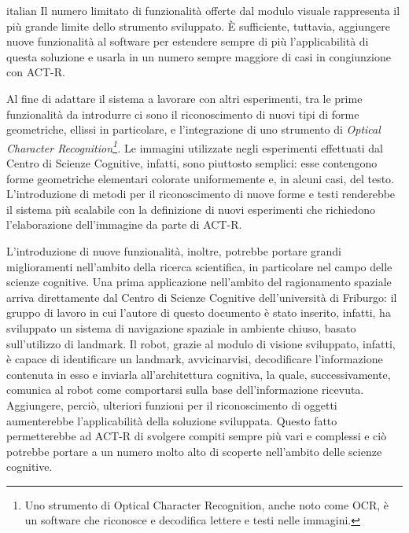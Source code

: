 \begin{otherlanguage*}{italian}
		Il numero limitato di funzionalità offerte dal modulo visuale rappresenta il più grande limite dello strumento sviluppato. 
		È sufficiente, tuttavia, aggiungere nuove funzionalità al software per estendere sempre di più l'applicabilità di questa soluzione e usarla in un numero sempre maggiore di casi in congiunzione con \mbox{ACT-R}.

		Al fine di adattare il sistema a lavorare con altri esperimenti, tra le prime funzionalità da introdurre ci sono il riconoscimento di nuovi tipi di forme geometriche, ellissi in particolare, e l'integrazione di uno strumento di \emph{Optical Character Recognition\footnote{Uno strumento di Optical Character Recognition, anche noto come OCR, è un software che riconosce e decodifica lettere e testi nelle immagini.}.}
		Le immagini utilizzate negli esperimenti effettuati dal Centro di Scienze Cognitive, infatti, sono piuttosto semplici: esse contengono forme geometriche elementari colorate uniformemente e, in alcuni casi, del testo.
		L'introduzione di metodi per il riconoscimento di nuove forme e testi renderebbe il sistema più scalabile con la definizione di nuovi esperimenti che richiedono l'elaborazione dell'immagine da parte di \mbox{ACT-R}.

		L'introduzione di nuove funzionalità, inoltre, potrebbe portare grandi miglioramenti nell'ambito della ricerca scientifica, in particolare nel campo delle scienze cognitive.
		Una prima applicazione nell'ambito del ragionamento spaziale arriva direttamente dal Centro di Scienze Cognitive dell'università di Friburgo: il gruppo di lavoro in cui l'autore di questo documento è stato inserito, infatti, ha sviluppato un sistema di navigazione spaziale in ambiente chiuso, basato sull'utilizzo di landmark.
		Il robot, grazie al modulo di visione sviluppato, infatti, è capace di identificare un landmark, avvicinarvisi, decodificare l'informazione contenuta in esso e inviarla all'architettura cognitiva, la quale, successivamente, comunica al robot come comportarsi sulla base dell'informazione ricevuta.
		Aggiungere, perciò, ulteriori funzioni per il riconoscimento di oggetti aumenterebbe l'applicabilità della soluzione sviluppata.	
		Questo fatto permetterebbe ad \mbox{ACT-R} di svolgere compiti sempre più vari e complessi e ciò potrebbe portare a un numero molto alto di scoperte nell'ambito delle scienze cognitive.



\end{otherlanguage*}
